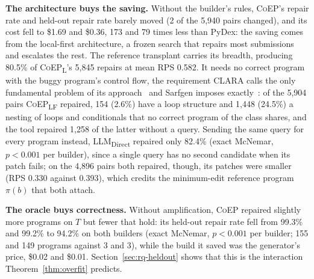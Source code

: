 \documentclass[acmsmall,screen,review,anonymous,nonacm]{acmart}
\newcommand{\tool}{\textsc{CoEP}\xspace}
\newcommand{\coepL}{\textsc{CoEP}\textsubscript{L}\xspace}
\newcommand{\coepLF}{\textsc{CoEP}\textsubscript{LF}\xspace}
\newcommand{\direct}{LLM\textsubscript{Direct}\xspace}
\begin{document}
\textbf{The architecture buys the saving.} Without the builder's rules, \tool's repair rate and held-out repair rate barely moved (2 of the 5{,}940 pairs changed), and its cost fell to \$1.69 and \$0.36, 173 and 79 times less than PyDex: the saving comes from the local-first architecture, a frozen search that repairs most submissions and escalates the rest. The reference transplant carries its breadth, producing 80.5\% of \coepL's 5{,}845 repairs at mean RPS 0.582. It needs no correct program with the buggy program's control flow, the requirement CLARA calls the only fundamental problem of its approach~\cite{gulwani2018automated} and Sarfgen imposes exactly~\cite{wang2018search}: of the 5{,}904 pairs \coepLF repaired, 154 (2.6\%) have a loop structure and 1{,}448 (24.5\%) a nesting of loops and conditionals that no correct program of the class shares, and the tool repaired 1{,}258 of the latter without a query. Sending the same query for every program instead, \direct repaired only 82.4\% (exact McNemar, $p < 0.001$ per builder), since a single query has no second candidate when its patch fails; on the 4{,}896 pairs both repaired, though, its patches were smaller (RPS 0.330 against 0.393), which credits the minimum-edit reference program $\pi(b)$ that both attach.

\textbf{The oracle buys correctness.} Without amplification, \tool repaired slightly more programs on $T$ but fewer that hold: its held-out repair rate fell from 99.3\% and 99.2\% to 94.2\% on both builders (exact McNemar, $p < 0.001$ per builder; 155 and 149 programs against 3 and 3), while the build it saved was the generator's price, \$0.02 and \$0.01. Section~\ref{sec:rq-heldout} shows that this is the interaction Theorem~\ref{thm:overfit} predicts.
\end{document}
